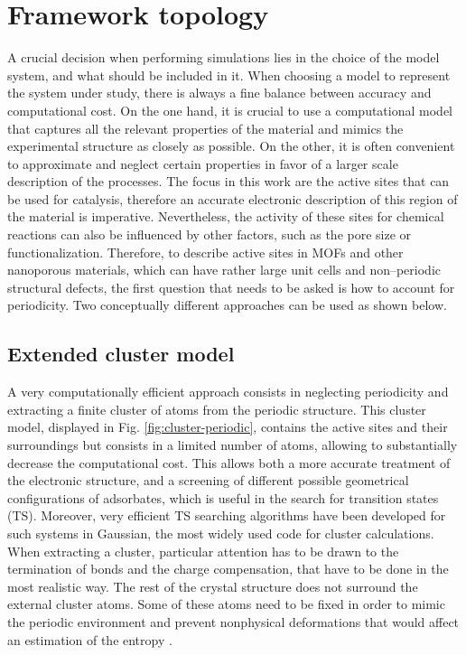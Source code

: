 \section{Framework topology}
A crucial decision when performing simulations lies in the choice of the model system, and what should be included in it. When choosing a model to represent the system under study, there is always a fine balance between accuracy and computational cost. 
On the one hand, it is crucial to use a computational model that captures all the relevant properties of the material and mimics the experimental structure as closely as possible. On the other, it is often convenient to approximate and neglect certain properties in favor of a larger scale description of the processes. The focus in this work are the active sites that can be used for catalysis, therefore an accurate electronic description of this region of the material is imperative. Nevertheless, the activity of these sites for chemical reactions can also be influenced by other factors, such as the pore size or functionalization. Therefore, to describe active sites in MOFs and other nanoporous materials, which can have rather large unit cells and non--periodic structural defects, the first question that needs to be asked is how to account for periodicity. Two conceptually different approaches can be used as shown below.

\subsection*{Extended cluster model}
A very computationally efficient approach consists in neglecting periodicity and extracting a finite cluster of atoms from the periodic structure. This cluster model, displayed in Fig. \ref{fig:cluster-periodic}, contains the active sites and their surroundings but consists in a limited number of atoms, allowing to substantially decrease the computational cost. 
This allows both a more accurate treatment of the electronic structure, and a screening of different possible geometrical configurations of adsorbates, which is useful in the search for transition states (TS). Moreover, very efficient TS searching algorithms have been developed for such systems in Gaussian, the most widely used code for cluster calculations.
When extracting a cluster, particular attention has to be drawn to the termination of bonds and the charge compensation, that have to be done in the most realistic way. The rest of the crystal structure does not surround the external cluster atoms. Some of these atoms need to be fixed in order to mimic the periodic environment and prevent nonphysical deformations that would affect an estimation of the entropy \cite{DeWispelaere2018}.

